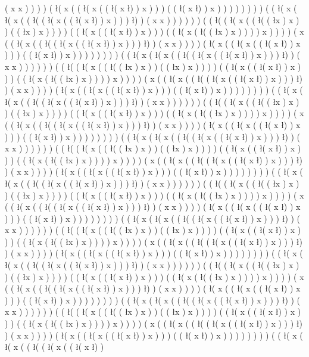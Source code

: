 ( x x ) ) ) ) ( \l ( x ( ( \l ( x ( ( \l ( x \l ) ) x ) ) ) ( ( \l ( x \l ) ) x ) ) ) ) ) ) ) ) ( ( \l ( x ( \l ( x ( ( \l ( ( \l ( x ( ( \l ( x \l ) ) x ) ) ) \l ) ) ( x x ) ) ) ) ) ) ( ( \l ( ( \l ( x ( ( \l ( ( \l x ) x ) ) ( ( \l x ) x ) ) ) ) ( ( \l ( x ( ( \l ( x \l ) ) x ) ) ) ( ( \l ( x ( \l ( ( \l x ) x ) ) ) ) x ) ) ) ) ( x ( ( \l ( x ( ( \l ( ( \l ( x ( ( \l ( x \l ) ) x ) ) ) \l ) ) ( x x ) ) ) ) ( \l ( x ( ( \l ( x ( ( \l ( x \l ) ) x ) ) ) ( ( \l ( x \l ) ) x ) ) ) ) ) ) ) ) ( ( \l ( x ( \l ( x ( ( \l ( ( \l ( x ( ( \l ( x \l ) ) x ) ) ) \l ) ) ( x x ) ) ) ) ) ) ( ( \l ( ( \l ( x ( ( \l ( ( \l x ) x ) ) ( ( \l x ) x ) ) ) ) ( ( \l ( x ( ( \l ( x \l ) ) x ) ) ) ( ( \l ( x ( \l ( ( \l x ) x ) ) ) ) x ) ) ) ) ( x ( ( \l ( x ( ( \l ( ( \l ( x ( ( \l ( x \l ) ) x ) ) ) \l ) ) ( x x ) ) ) ) ( \l ( x ( ( \l ( x ( ( \l ( x \l ) ) x ) ) ) ( ( \l ( x \l ) ) x ) ) ) ) ) ) ) ) ( ( \l ( x ( \l ( x ( ( \l ( ( \l ( x ( ( \l ( x \l ) ) x ) ) ) \l ) ) ( x x ) ) ) ) ) ) ( ( \l ( ( \l ( x ( ( \l ( ( \l x ) x ) ) ( ( \l x ) x ) ) ) ) ( ( \l ( x ( ( \l ( x \l ) ) x ) ) ) ( ( \l ( x ( \l ( ( \l x ) x ) ) ) ) x ) ) ) ) ( x ( ( \l ( x ( ( \l ( ( \l ( x ( ( \l ( x \l ) ) x ) ) ) \l ) ) ( x x ) ) ) ) ( \l ( x ( ( \l ( x ( ( \l ( x \l ) ) x ) ) ) ( ( \l ( x \l ) ) x ) ) ) ) ) ) ) ) ( ( \l ( x ( \l ( x ( ( \l ( ( \l ( x ( ( \l ( x \l ) ) x ) ) ) \l ) ) ( x x ) ) ) ) ) ) ( ( \l ( ( \l ( x ( ( \l ( ( \l x ) x ) ) ( ( \l x ) x ) ) ) ) ( ( \l ( x ( ( \l ( x \l ) ) x ) ) ) ( ( \l ( x ( \l ( ( \l x ) x ) ) ) ) x ) ) ) ) ( x ( ( \l ( x ( ( \l ( ( \l ( x ( ( \l ( x \l ) ) x ) ) ) \l ) ) ( x x ) ) ) ) ( \l ( x ( ( \l ( x ( ( \l ( x \l ) ) x ) ) ) ( ( \l ( x \l ) ) x ) ) ) ) ) ) ) ) ( ( \l ( x ( \l ( x ( ( \l ( ( \l ( x ( ( \l ( x \l ) ) x ) ) ) \l ) ) ( x x ) ) ) ) ) ) ( ( \l ( ( \l ( x ( ( \l ( ( \l x ) x ) ) ( ( \l x ) x ) ) ) ) ( ( \l ( x ( ( \l ( x \l ) ) x ) ) ) ( ( \l ( x ( \l ( ( \l x ) x ) ) ) ) x ) ) ) ) ( x ( ( \l ( x ( ( \l ( ( \l ( x ( ( \l ( x \l ) ) x ) ) ) \l ) ) ( x x ) ) ) ) ( \l ( x ( ( \l ( x ( ( \l ( x \l ) ) x ) ) ) ( ( \l ( x \l ) ) x ) ) ) ) ) ) ) ) ( ( \l ( x ( \l ( x ( ( \l ( ( \l ( x ( ( \l ( x \l ) ) x ) ) ) \l ) ) ( x x ) ) ) ) ) ) ( ( \l ( ( \l ( x ( ( \l ( ( \l x ) x ) ) ( ( \l x ) x ) ) ) ) ( ( \l ( x ( ( \l ( x \l ) ) x ) ) ) ( ( \l ( x ( \l ( ( \l x ) x ) ) ) ) x ) ) ) ) ( x ( ( \l ( x ( ( \l ( ( \l ( x ( ( \l ( x \l ) ) x ) ) ) \l ) ) ( x x ) ) ) ) ( \l ( x ( ( \l ( x ( ( \l ( x \l ) ) x ) ) ) ( ( \l ( x \l ) ) x ) ) ) ) ) ) ) ) ( ( \l ( x ( \l ( x ( ( \l ( ( \l ( x ( ( \l ( x \l ) ) x ) ) ) \l ) ) ( x x ) ) ) ) ) ) ( ( \l ( ( \l ( x ( ( \l ( ( \l x ) x ) ) ( ( \l x ) x ) ) ) ) ( ( \l ( x ( ( \l ( x \l ) ) x ) ) ) ( ( \l ( x ( \l ( ( \l x ) x ) ) ) ) x ) ) ) ) ( x ( ( \l ( x ( ( \l ( ( \l ( x ( ( \l ( x \l ) ) x ) ) ) \l ) ) ( x x ) ) ) ) ( \l ( x ( ( \l ( x ( ( \l ( x \l ) ) x ) ) ) ( ( \l ( x \l ) ) x ) ) ) ) ) ) ) ) ( ( \l ( x ( \l ( x ( ( \l ( ( \l ( x ( ( \l ( x \l ) ) x ) ) ) \l ) ) ( x x ) ) ) ) ) ) ( ( \l ( ( \l ( x ( ( \l ( ( \l x ) x ) ) ( ( \l x ) x ) ) ) ) ( ( \l ( x ( ( \l ( x \l ) ) x ) ) ) ( ( \l ( x ( \l ( ( \l x ) x ) ) ) ) x ) ) ) ) ( x ( ( \l ( x ( ( \l ( ( \l ( x ( ( \l ( x \l ) ) x ) ) ) \l ) ) ( x x ) ) ) ) ( \l ( x ( ( \l ( x ( ( \l ( x \l ) ) x ) ) ) ( ( \l ( x \l ) ) x ) ) ) ) ) ) ) ) ( ( \l ( x ( \l ( x ( ( \l ( ( \l ( x ( ( \l ( x \l ) ) 